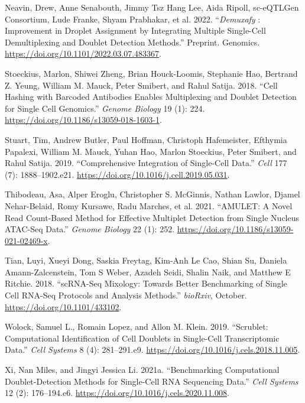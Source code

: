 \documentclass[10pt,a4paper,twocolumn]{article}
\begin{document}
\begin{CSLReferences}{1}{0}
\leavevmode\hypertarget{ref-neavinDemuxafyImprovementDroplet2022}{}%
Neavin, Drew, Anne Senabouth, Jimmy Tsz Hang Lee, Aida Ripoll, sc-eQTLGen Consortium, Lude Franke, Shyam Prabhakar, et al. 2022. {``\emph{Demuxafy} : Improvement in Droplet Assignment by Integrating Multiple Single-Cell Demultiplexing and Doublet Detection Methods.''} Preprint. Genomics. \url{https://doi.org/10.1101/2022.03.07.483367}.

\leavevmode\hypertarget{ref-stoeckiusCellHashingBarcoded2018}{}%
Stoeckius, Marlon, Shiwei Zheng, Brian Houck-Loomis, Stephanie Hao, Bertrand Z. Yeung, William M. Mauck, Peter Smibert, and Rahul Satija. 2018. {``Cell Hashing with Barcoded Antibodies Enables Multiplexing and Doublet Detection for Single Cell Genomics.''} \emph{Genome Biology} 19 (1): 224. \url{https://doi.org/10.1186/s13059-018-1603-1}.

\leavevmode\hypertarget{ref-stuartComprehensiveIntegrationSingleCell2019}{}%
Stuart, Tim, Andrew Butler, Paul Hoffman, Christoph Hafemeister, Efthymia Papalexi, William M. Mauck, Yuhan Hao, Marlon Stoeckius, Peter Smibert, and Rahul Satija. 2019. {``Comprehensive Integration of Single-Cell Data.''} \emph{Cell} 177 (7): 1888--1902.e21. \url{https://doi.org/10.1016/j.cell.2019.05.031}.

\leavevmode\hypertarget{ref-thibodeauAMULETNovelRead2021}{}%
Thibodeau, Asa, Alper Eroglu, Christopher S. McGinnis, Nathan Lawlor, Djamel Nehar-Belaid, Romy Kursawe, Radu Marches, et al. 2021. {``AMULET: A Novel Read Count-Based Method for Effective Multiplet Detection from Single Nucleus ATAC-Seq Data.''} \emph{Genome Biology} 22 (1): 252. \url{https://doi.org/10.1186/s13059-021-02469-x}.

\leavevmode\hypertarget{ref-tianScRNAseqMixologyBetter2018}{}%
Tian, Luyi, Xueyi Dong, Saskia Freytag, Kim-Anh Le Cao, Shian Su, Daniela Amann-Zalcenstein, Tom S Weber, Azadeh Seidi, Shalin Naik, and Matthew E Ritchie. 2018. {``scRNA-Seq Mixology: Towards Better Benchmarking of Single Cell RNA-Seq Protocols and Analysis Methods.''} \emph{bioRxiv}, October. \url{https://doi.org/10.1101/433102}.

\leavevmode\hypertarget{ref-wolockScrubletComputationalIdentification2019}{}%
Wolock, Samuel L., Romain Lopez, and Allon M. Klein. 2019. {``Scrublet: Computational Identification of Cell Doublets in Single-Cell Transcriptomic Data.''} \emph{Cell Systems} 8 (4): 281--291.e9. \url{https://doi.org/10.1016/j.cels.2018.11.005}.

\leavevmode\hypertarget{ref-xiBenchmarkingComputationalDoubletDetection2021}{}%
Xi, Nan Miles, and Jingyi Jessica Li. 2021a. {``Benchmarking Computational Doublet-Detection Methods for Single-Cell RNA Sequencing Data.''} \emph{Cell Systems} 12 (2): 176--194.e6. \url{https://doi.org/10.1016/j.cels.2020.11.008}.


\end{CSLReferences}
\end{document}
